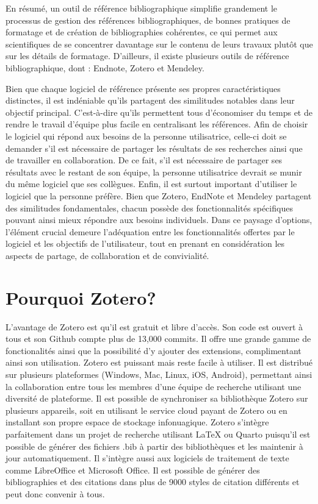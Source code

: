 \documentclass[
  letterpaper,
]{scrbook}
\begin{document}
En résumé, un outil de référence bibliographique simplifie grandement le
processus de gestion des références bibliographiques, de bonnes
pratiques de formatage et de création de bibliographies cohérentes, ce
qui permet aux scientifiques de se concentrer davantage sur le contenu
de leurs travaux plutôt que sur les détails de formatage. D'ailleurs, il
existe plusieurs outils de référence bibliographique, dont : Endnote,
Zotero et Mendeley.

Bien que chaque logiciel de référence présente ses propres
caractéristiques distinctes, il est indéniable qu'ils partagent des
similitudes notables dans leur objectif principal. C'est-à-dire qu'ils
permettent tous d'économiser du temps et de rendre le travail d'équipe
plus facile en centralisant les références. Afin de choisir le logiciel
qui répond aux besoins de la personne utilisatrice, celle-ci doit se
demander s'il est nécessaire de partager les résultats de ses recherches
ainsi que de travailler en collaboration. De ce fait, s'il est
nécessaire de partager ses résultats avec le restant de son équipe, la
personne utilisatrice devrait se munir du même logiciel que ses
collègues. Enfin, il est surtout important d'utiliser le logiciel que la
personne préfère. Bien que Zotero, EndNote et Mendeley partagent des
similitudes fondamentales, chacun possède des fonctionnalités
spécifiques pouvant ainsi mieux répondre aux besoins individuels. Dans
ce paysage d'options, l'élément crucial demeure l'adéquation entre les
fonctionnalités offertes par le logiciel et les objectifs de
l'utilisateur, tout en prenant en considération les aspects de partage,
de collaboration et de convivialité.

\hypertarget{pourquoi-zotero}{%
\section{Pourquoi Zotero?}\label{pourquoi-zotero}}

L'avantage de Zotero est qu'il est gratuit et libre d'accès. Son code
est ouvert à tous et son Github compte plus de 13,000 commits. Il offre
une grande gamme de fonctionalités ainsi que la possibilité d'y ajouter
des extensions, complimentant ainsi son utilisation. Zotero est puissant
mais reste facile à utiliser. Il est distribué sur plusieurs plateformes
(Windows, Mac, Linux, iOS, Android), permettant ainsi la collaboration
entre tous les membres d'une équipe de recherche utilisant une diversité
de plateforme. Il est possible de synchroniser sa bibliothèque Zotero
sur plusieurs appareils, soit en utilisant le service cloud payant de
Zotero ou en installant son propre espace de stockage infonuagique.
Zotero s'intègre parfaitement dans un projet de recherche utilisant
LaTeX ou Quarto puisqu'il est possible de générer des fichiers .bib à
partir des bibliothèques et les maintenir à jour automatiquement. Il
s'intègre aussi aux logiciels de traitement de texte comme LibreOffice
et Microsoft Office. Il est possible de générer des bibliographies et
des citations dans plus de 9000 styles de citation différents et peut
donc convenir à tous.
\end{document}

